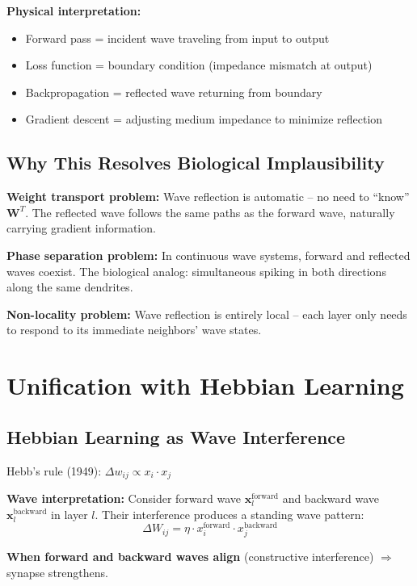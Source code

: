 \documentclass{article}
\begin{document}
\textbf{Physical interpretation:} 
\begin{itemize}
\item Forward pass = incident wave traveling from input to output
\item Loss function = boundary condition (impedance mismatch at output)
\item Backpropagation = reflected wave returning from boundary
\item Gradient descent = adjusting medium impedance to minimize reflection
\end{itemize}

\subsection{Why This Resolves Biological Implausibility}

\textbf{Weight transport problem:} Wave reflection is automatic -- no need to ``know'' $\mathbf{W}^T$. The reflected wave follows the same paths as the forward wave, naturally carrying gradient information.

\textbf{Phase separation problem:} In continuous wave systems, forward and reflected waves coexist. The biological analog: simultaneous spiking in both directions along the same dendrites.

\textbf{Non-locality problem:} Wave reflection is entirely local -- each layer only needs to respond to its immediate neighbors' wave states.

\section{Unification with Hebbian Learning}
\label{sec:unification}

\subsection{Hebbian Learning as Wave Interference}

Hebb's rule (1949): $\Delta w_{ij} \propto x_i \cdot x_j$

\textbf{Wave interpretation:} Consider forward wave $\mathbf{x}_l^{\text{forward}}$ and backward wave $\mathbf{x}_l^{\text{backward}}$ in layer $l$. Their interference produces a standing wave pattern:
\begin{equation}
\Delta W_{ij} = \eta \cdot x_i^{\text{forward}} \cdot x_j^{\text{backward}}
\end{equation}

\textbf{When forward and backward waves align} (constructive interference) $\Rightarrow$ synapse strengthens.
\end{document}
